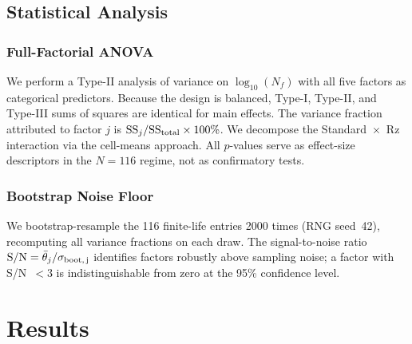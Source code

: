 \documentclass[12pt,a4paper]{article}
\begin{document}
\subsection{Statistical Analysis}

\subsubsection{Full-Factorial ANOVA}

We perform a Type-II analysis of variance on $\log_{10}(N_f)$ with all
five factors as categorical predictors. Because the design is balanced,
Type-I, Type-II, and Type-III sums of squares are identical for main
effects. The variance fraction attributed to factor $j$ is
$\mathrm{SS}_j / \mathrm{SS}_{\rm total} \times 100\%$. We decompose
the Standard~$\times$~Rz interaction via the cell-means approach.
All $p$-values serve as effect-size descriptors in the $N=116$ regime,
not as confirmatory tests.

\subsubsection{Bootstrap Noise Floor}

We bootstrap-resample the 116 finite-life entries 2000 times (RNG%
seed~42), recomputing all variance fractions on each draw. The
signal-to-noise ratio $\mathrm{S/N} = \bar{\theta}_j /
\sigma_{\rm boot,\,j}$ identifies factors robustly above sampling noise;
a factor with S/N~$<3$ is indistinguishable from zero at the 95\%
confidence level.

\section{Results}
\label{sec:results}
\end{document}
